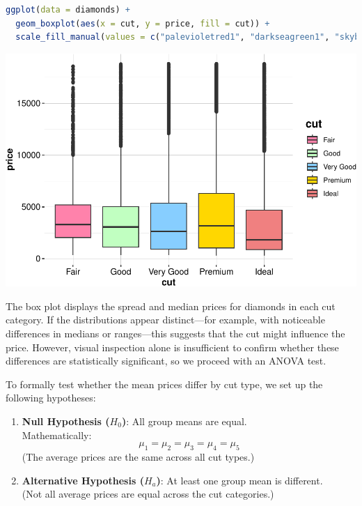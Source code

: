 \documentclass[
]{book}
\theoremstyle{definition}
\theoremstyle{definition}
\theoremstyle{definition}
\theoremstyle{definition}
\theoremstyle{remark}
\begin{document}
\begin{lstlisting}[language=R]
ggplot(data = diamonds) + 
  geom_boxplot(aes(x = cut, y = price, fill = cut)) +
  scale_fill_manual(values = c("palevioletred1", "darkseagreen1", "skyblue1", "gold1", "lightcoral"))
\end{lstlisting}

\begin{center}\includegraphics{statistics_files/figure-latex/unnamed-chunk-17-1} \end{center}

The box plot displays the spread and median prices for diamonds in each cut category. If the distributions appear distinct---for example, with noticeable differences in medians or ranges---this suggests that the cut might influence the price. However, visual inspection alone is insufficient to confirm whether these differences are statistically significant, so we proceed with an ANOVA test.

To formally test whether the mean prices differ by cut type, we set up the following hypotheses:

\begin{enumerate}
\def\labelenumi{\arabic{enumi}.}
\item
  \textbf{Null Hypothesis (\(H_0\))}: All group means are equal.\\
  Mathematically:\\
  \[
  \mu_1 = \mu_2 = \mu_3 = \mu_4 = \mu_5
  \]
  (The average prices are the same across all cut types.)
\item
  \textbf{Alternative Hypothesis (\(H_a\))}: At least one group mean is different.\\
  (Not all average prices are equal across the cut categories.)
\end{enumerate}
\end{document}
